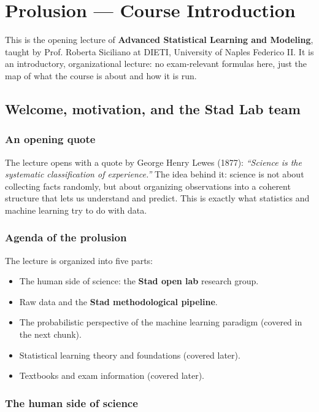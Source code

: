 \section{Prolusion --- Course Introduction}\label{sec:prolusion}

This is the opening lecture of \textbf{Advanced Statistical Learning and Modeling}, taught by Prof. Roberta Siciliano at DIETI, University of Naples Federico II. It is an introductory, organizational lecture: no exam-relevant formulas here, just the map of what the course is about and how it is run.

\subsection{Welcome, motivation, and the Stad Lab team}\label{sec:prolusion-welcome}

\subsubsection{An opening quote}

The lecture opens with a quote by George Henry Lewes (1877): \textit{``Science is the systematic classification of experience.''} The idea behind it: science is not about collecting facts randomly, but about organizing observations into a coherent structure that lets us understand and predict. This is exactly what statistics and machine learning try to do with data.

\subsubsection{Agenda of the prolusion}

The lecture is organized into five parts:
\begin{itemize}
  \item The human side of science: the \textbf{Stad open lab} research group.
  \item Raw data and the \textbf{Stad methodological pipeline}.
  \item The probabilistic perspective of the machine learning paradigm (covered in the next chunk).
  \item Statistical learning theory and foundations (covered later).
  \item Textbooks and exam information (covered later).
\end{itemize}

\subsubsection{The human side of science}

